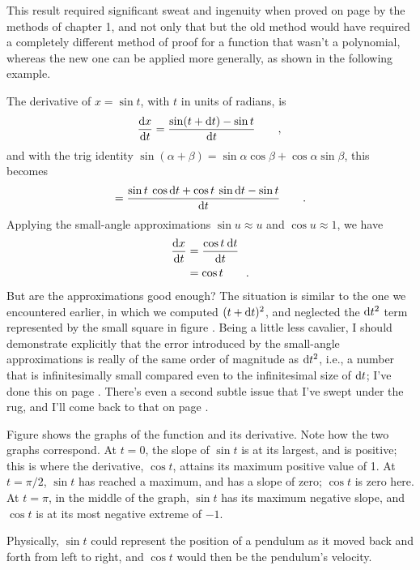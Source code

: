 This result
required significant sweat and ingenuity when proved on page \pageref{detour:polynomial-proof} by the methods of chapter 1,
and not only that but the old method would have required a completely different method of proof for a function that
wasn't a polynomial, whereas the new one can be applied more generally, as shown in the following example.

\begin{eg}\label{eg:derivative-of-sin}
The derivative of $x=\sin t$, with $t$ in units of radians, is
\begin{equation*}
  \frac{\textup{d} x}{\textup{d} t} = \frac{\sin(t+\textup{d} t)-\sin t}{\textup{d} t} \qquad , \\
\end{equation*}
and with the trig identity $\sin(\alpha+\beta)=\sin\alpha\cos\beta+\cos\alpha\sin\beta$, this becomes
\begin{equation*}
                        = \frac{\sin t \: \cos \textup{d} t + \cos t \: \sin \textup{d} t - \sin t}{\textup{d} t} \qquad .\\
\end{equation*}
Applying the small-angle approximations $\sin u\approx u$ and $\cos u\approx 1$,
we have
\begin{align*}
\frac{\textup{d} x}{\textup{d} t}   &= \frac{\cos t \: \textup{d} t}{\textup{d} t} \\
                        &= \cos t \qquad .
\end{align*}
But are the approximations good enough? The situation is similar to the one we encountered earlier,
in which we computed $(t+\textup{d} t)^2$, and neglected the $\textup{d} t^2$ term represented by the small square
in figure . Being a little less cavalier, I should demonstrate
explicitly that the error introduced by the small-angle approximations is really of the same order
of magnitude as $\textup{d} t^2$, i.e., a number that is infinitesimally small compared even to the
infinitesimal size of $\textup{d} t$; I've done this on page \pageref{detour:sin-rigor}.
There's even a second subtle issue that I've swept under the rug, and I'll come back to that on page
\pageref{transcendentals}.

Figure  shows the graphs of the function and its derivative. Note how the two
graphs correspond. At $t=0$, the slope of $\sin t$ is at its largest, and is positive; this is where
the derivative, $\cos t$, attains its maximum positive value of 1. At $t=\pi/2$, $\sin t$ has reached
a maximum, and has a slope of zero; $\cos t$ is zero here. At $t=\pi$, in the middle of the graph,
$\sin t$ has its maximum negative slope, and $\cos t$ is at its most negative extreme of $-1$.

Physically, $\sin t$ could represent the position of a pendulum as it moved back and forth from left
to right, and $\cos t$ would then be the pendulum's velocity.
\end{eg}
%

